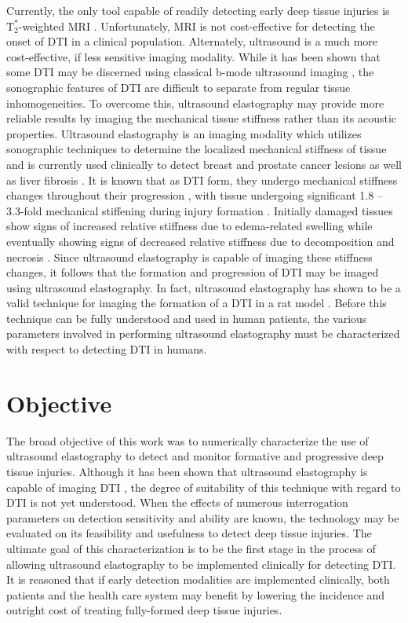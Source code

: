 		Currently, the only tool capable of readily detecting early deep tissue injuries is $\mathrm{T}_2^*$-weighted MRI \cite{stekelenburg06,loerakker11}. Unfortunately, MRI is not cost-effective for detecting the onset of DTI in a clinical population. Alternately, ultrasound is a much more cost-effective, if less sensitive imaging modality. While it has been shown that some DTI may be discerned using classical b-mode ultrasound imaging \cite{aoi08, kanno09}, the sonographic features of DTI are difficult to separate from regular tissue inhomogeneities. To overcome this, ultrasound elastography may provide more reliable results by imaging the mechanical tissue stiffness rather than its acoustic properties. Ultrasound elastography is an imaging modality which utilizes sonographic techniques to determine the localized mechanical stiffness of tissue and is currently used clinically to detect breast and prostate cancer lesions \cite{tanter08, konig05} as well as liver fibrosis \cite{sandrin03}. It is known that as DTI form, they undergo mechanical stiffness changes throughout their progression \cite{linderganz04,oomens10,solis12-03}, with tissue undergoing significant 1.8 -- 3.3-fold mechanical stiffening during injury formation \cite{gefen05}. Initially damaged tissues show signs of increased relative stiffness due to edema-related swelling while eventually showing signs of decreased relative stiffness due to decomposition and necrosis \cite{gefen09}. Since ultrasound elastography is capable of imaging these stiffness changes, it follows that the formation and progression of DTI may be imaged using ultrasound elastography. In fact, ultrasound elastography has shown to be a valid technique for imaging the formation of a DTI in a rat model \cite{deprez11}. Before this technique can be fully understood and used in human patients, the various parameters involved in performing ultrasound elastography must be characterized with respect to detecting DTI in humans.

	\section{Objective}
		The broad objective of this work was to numerically characterize the use of ultrasound elastography to detect and monitor formative and progressive deep tissue injuries. Although it has been shown that ultrasound elastography is capable of imaging DTI \cite{deprez11}, the degree of suitability of this technique with regard to DTI is not yet understood. When the effects of numerous interrogation parameters on detection sensitivity and ability are known, the technology may be evaluated on its feasibility and usefulness to detect deep tissue injuries. The ultimate goal of this characterization is to be the first stage in the process of allowing ultrasound elastography to be implemented clinically for detecting DTI. It is reasoned that if early detection modalities are implemented clinically, both patients and the health care system may benefit by lowering the incidence and outright cost of treating fully-formed deep tissue injuries.

